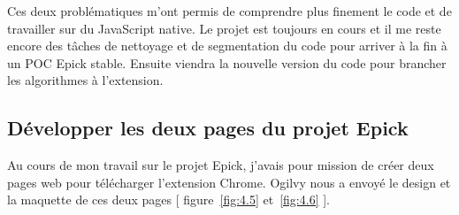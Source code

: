 \documentclass[a4paper, 12pt]{report}
\begin{document}
Ces deux problématiques m’ont permis de comprendre plus finement le code et de travailler sur du JavaScript native. Le projet est toujours en cours et il me reste encore des tâches de nettoyage et de segmentation du code pour arriver à la fin à un POC Epick stable. Ensuite viendra la nouvelle version du code pour brancher les algorithmes à l’extension.\\
\subsection{Développer les deux pages du projet Epick}
Au cours de mon travail sur le projet Epick, j'avais pour mission de créer deux pages web pour télécharger l’extension Chrome.
Ogilvy nous a envoyé le design et la maquette de ces deux pages [ figure~\ref{fig:4.5} et~\ref{fig:4.6} ].\\
\end{document}

